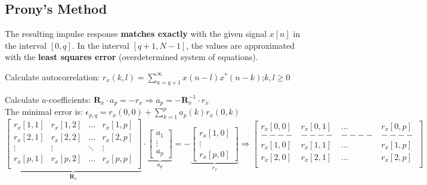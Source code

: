 \vspace{-1.0cm}


\subsection{Prony's Method }
The resulting impulse response \textbf{matches exactly} with the given signal $x[n]$ in the interval $[0, q]$.
In the interval $[q + 1, N-1]$, the values are approximated with the
\textbf{least squares error} (overdetermined system of equations).


\renewcommand{\arraystretch}{1.0}

\begin{aufzaehlung}
	\item Calculate autocorrelation: $ r_x(k,l) = \sum\limits_{n=q+1}^\infty x(n-l)x^*(n-k)$;\qquad $k,l\geq 0$
	\item Calculate $a$-coefficients: $\bm R_x \cdot a_p = -r_x \Longrightarrow a_p = - \bm R_x^{-1} \cdot r_x$ 
  		 \small\\
		The minimal error is: $\epsilon_{p,q} = r_x(0,0) + \sum\limits_{k=1}^p a_p(k) r_x(0,k)$
			$$
		\underbrace{\begin{bmatrix}
    		r_x[1,1] & r_x[1,2] & \hdots & r_x[1,p] \\
    		r_x[2,1] & r_x[2,2] & \hdots & r_x[2,p] \\
    		\vdots & \vdots & \ddots & \vdots \\
    		r_x[p,1] & r_x[p,2] & \hdots & r_x[p,p] \\
		\end{bmatrix}  }_{\bm R_x} \cdot
		\underbrace{\begin{bmatrix}
    		a_1 \\
    		\vdots \\
    		a_p
		\end{bmatrix}  }_{a_p}= -\underbrace{\begin{bmatrix}
    		r_x[1,0] \\
    		\vdots \\
    		r_x[p,0]
		\end{bmatrix}  }_{r_x}
		\Longrightarrow
		\begin{bmatrix}
    		r_x[0,0] & r_x[0,1] & \hdots & r_x[0,p] \\ 
    		----&----&----&----\\
    		r_x[1,0] & r_x[1,1] & \hdots & r_x[1,p] \\                                   
    		r_x[2,0] & r_x[2,1] & \hdots & r_x[2,p] \\

\end{bmatrix}$$
\end{aufzaehlung}
